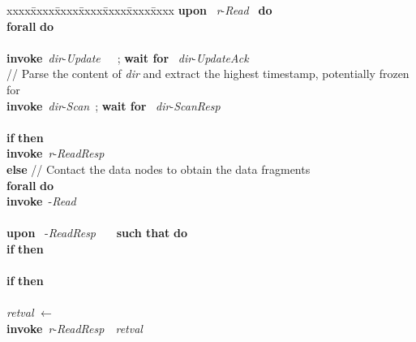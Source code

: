 \documentclass[oribibl]{llncs}
\theoremstyle{definition-boldhead}
\newcommand{\var}[1]{\textit{#1}}
\newcommand{\newe}{{\bf invoke}\xspace}
\newcommand{\event}[2]{~{\var{#1}}-\textsl{#2}~}
\newcommand{\eventt}[3]{~{\var{#1}}-\textsl{#2}~~{#3}~}
\newcommand{\becomes}{\ensuremath{\leftarrow}}
\newcommand{\dir}{\var{dir}\xspace}
\newcommand{\NAME}{AWE\xspace}
\newcommand{\nodes}{nodes\xspace}
\begin{document}
\begin{alg}\small
\begin{tabbing}
  xxxx\=xxxx\=xxxx\=xxxx\=xxxx\=xxxx\=xxxx\kill
\textbf{upon} \event{r}{Read} \textbf{do} \\
  \> \textbf{forall}  \textbf{do}
         \\
  \>  \\
  \> \newe \eventt{dir}{Update}{};
     \textbf{wait for} \event{dir}{UpdateAck} \\
  \> // Parse the content of \dir and extract the
      highest timestamp, potentially frozen for~ \\
  \> \newe \event{dir}{Scan};
     \textbf{wait for} \eventt{dir}{ScanResp}{} \\
  \>  \\
  \> \textbf{if}  \textbf{then} \\
  \> \> \newe \eventt{r}{ReadResp}{} \\
  \> \textbf{else} // Contact the data \nodes to obtain the data fragments\\
  \> \> \textbf{forall}  \textbf{do} \\
  \> \> \> \newe \eventt{}{Read}{} \\
  \\
  \textbf{upon} \eventt{}{ReadResp}{}
	\textbf{such that}  \textbf{do} \\
  \> \textbf{if} 
        \textbf{then} \\
  \> \>  \\
  \> \> \textbf{if} 
     \textbf{then} \\
  \> \> \>  \\
  \> \> \> \var{retval} \becomes  \\
  \> \> \> \newe \eventt{r}{ReadResp}{\var{retval}}
\end{tabbing}
\caption{Protocol~\NAME, atomic register instance~\var{r}
  for client~ (part~2).}
\label{alg:client-2}
\end{alg}

\if\submit\no
\end{document}
